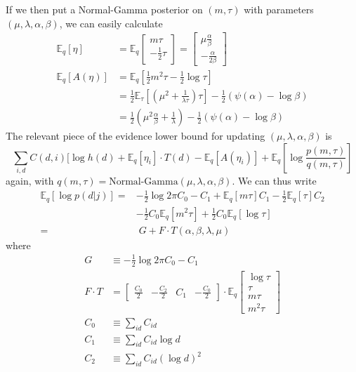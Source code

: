 \documentclass[10pt,letterpaper]{article}
\begin{document}
If we then put a Normal-Gamma posterior on $(m, \tau)$ with parameters $(\mu, \lambda, \alpha, \beta)$, we can easily calculate
\begin{align}
    \mathbb{E}_q[\eta] &= \mathbb{E}_q
    \begin{bmatrix}
    m\tau \\
    -\frac{1}{2}\tau
    \end{bmatrix} =
    \begin{bmatrix}
    \mu\frac{\alpha}{\beta} \\
    -\frac{\alpha}{2\beta}
    \end{bmatrix} \\
    \mathbb{E}_q[A(\eta)] &= \mathbb{E}_q\left[
    \frac{1}{2}m^2\tau - \frac{1}{2} \log \tau
    \right] \\
    &= \frac{1}{2} \mathbb{E}_\tau\left[
    \left(\mu^2 + \frac{1}{\lambda \tau}\right)\tau
    \right]
    -\frac{1}{2} (\psi(\alpha) - \log \beta) \\
    &= \frac{1}{2} \left(\mu^2 \frac{\alpha}{\beta} + \frac{1}{\lambda} \right)
    -\frac{1}{2} (\psi(\alpha) - \log \beta)
\end{align}
The relevant piece of the evidence lower bound for updating $(\mu, \lambda, \alpha, \beta)$ is
\begin{equation}
    \sum_{i, d} C(d, i) [ \log h(d) + \mathbb{E}_q[\eta_i] \cdot T(d) -
    \mathbb{E}_q[A(\eta_i)] + \mathbb{E}_q\left[\log \frac{p(m, \tau)}{q(m, \tau)} \right]
\end{equation}
again, with $q(m, \tau) = \text{Normal-Gamma}(\mu, \lambda, \alpha, \beta)$. We can thus write
\begin{align}
    \label{semi_markov_elogp}
    \mathbb{E}_q[\log p(d|j)] =& -\frac{1}{2}\log 2\pi C_0 - C_1 +
    \mathbb{E}_q[m\tau] C_1 -\frac{1}{2}\mathbb{E}_q[\tau] C_2  \nonumber \\
    &- \frac{1}{2} C_0 \mathbb{E}_q[m^2\tau] + \frac{1}{2} C_0 \mathbb{E}_q[\log \tau] \nonumber \\
    =& \; G + F \cdot T(\alpha, \beta, \lambda, \mu)
\end{align}
where
\begin{align}
    G &\equiv -\frac{1}{2}\log 2\pi C_0 - C_1 \\
    F \cdot T &=
    \begin{bmatrix}
        \frac{C_0}{2} &
        -\frac{C_2}{2} &
        C_1 &
        -\frac{C_0}{2}
    \end{bmatrix} \cdot \mathbb{E}_q
    \begin{bmatrix}
        \log \tau \\
        \tau \\
        m\tau \\
        m^2 \tau
    \end{bmatrix} \\
    C_0 &\equiv \sum_{id} C_{id} \\
    C_1 &\equiv \sum_{id} C_{id} \log d \\
    C_2 &\equiv \sum_{id} C_{id} (\log d)^2
\end{align}
\end{document}
